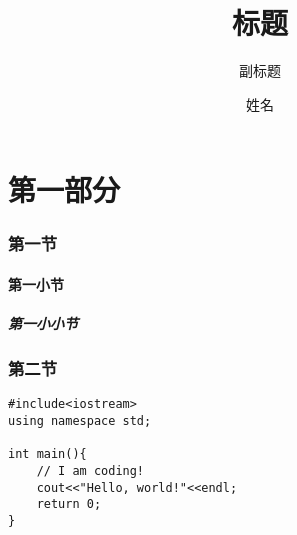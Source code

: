 \documentclass[UTF8,a4paper,heading=true]{ctexart} %
\subtitle{副标题}
\author{姓名}
\begin{document}
    \title{标题}
    \maketitle
    \tableofcontents
    \part{第一部分}
    \section{第一节}
    \subsection{第一小节}
    \subsubsection{第一小小节}
    \section{第二节}
    \clearpage
    \lstset{language=c++}
    \begin{lstlisting}[caption=test.cpp]
#include<iostream>
using namespace std;

int main(){
    // I am coding!
    cout<<"Hello, world!"<<endl;
    return 0;
}
\end{lstlisting}
\end{document}
